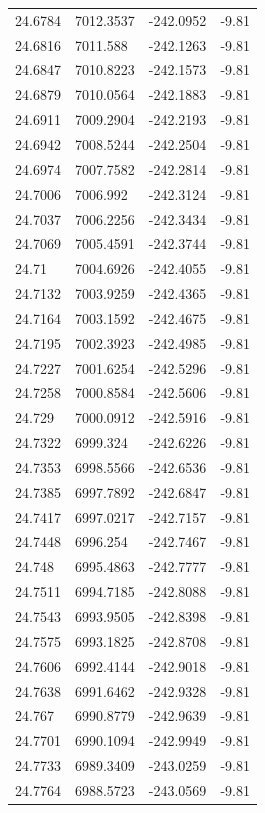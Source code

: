 \begin{table}[H]
\begin{tabular}{llll}
24.6784 & 7012.3537 & -242.0952 & -9.81 \\
24.6816 & 7011.588 & -242.1263 & -9.81 \\
24.6847 & 7010.8223 & -242.1573 & -9.81 \\
24.6879 & 7010.0564 & -242.1883 & -9.81 \\
24.6911 & 7009.2904 & -242.2193 & -9.81 \\
24.6942 & 7008.5244 & -242.2504 & -9.81 \\
24.6974 & 7007.7582 & -242.2814 & -9.81 \\
24.7006 & 7006.992 & -242.3124 & -9.81 \\
24.7037 & 7006.2256 & -242.3434 & -9.81 \\
24.7069 & 7005.4591 & -242.3744 & -9.81 \\
24.71 & 7004.6926 & -242.4055 & -9.81 \\
24.7132 & 7003.9259 & -242.4365 & -9.81 \\
24.7164 & 7003.1592 & -242.4675 & -9.81 \\
24.7195 & 7002.3923 & -242.4985 & -9.81 \\
24.7227 & 7001.6254 & -242.5296 & -9.81 \\
24.7258 & 7000.8584 & -242.5606 & -9.81 \\
24.729 & 7000.0912 & -242.5916 & -9.81 \\
24.7322 & 6999.324 & -242.6226 & -9.81 \\
24.7353 & 6998.5566 & -242.6536 & -9.81 \\
24.7385 & 6997.7892 & -242.6847 & -9.81 \\
24.7417 & 6997.0217 & -242.7157 & -9.81 \\
24.7448 & 6996.254 & -242.7467 & -9.81 \\
24.748 & 6995.4863 & -242.7777 & -9.81 \\
24.7511 & 6994.7185 & -242.8088 & -9.81 \\
24.7543 & 6993.9505 & -242.8398 & -9.81 \\
24.7575 & 6993.1825 & -242.8708 & -9.81 \\
24.7606 & 6992.4144 & -242.9018 & -9.81 \\
24.7638 & 6991.6462 & -242.9328 & -9.81 \\
24.767 & 6990.8779 & -242.9639 & -9.81 \\
24.7701 & 6990.1094 & -242.9949 & -9.81 \\
24.7733 & 6989.3409 & -243.0259 & -9.81 \\
24.7764 & 6988.5723 & -243.0569 & -9.81 \\

\end{tabular}
\end{table}
